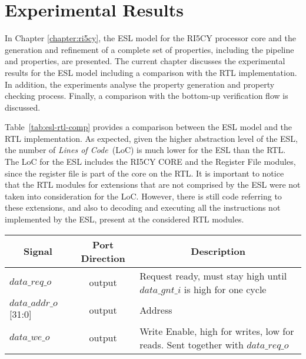 \chapter{Experimental Results}

In Chapter \ref{chapter:ri5cy}, the ESL model for the RI5CY processor core and the generation and refinement of a complete set of properties, including the pipeline and \SSQED{} properties, are presented. The current chapter discusses the experimental results for the ESL model including a comparison with the RTL implementation. In addition, the experiments analyse the property generation and property checking process. Finally, a comparison with the bottom-up verification flow is discussed.

Table~\ref{tab:esl-rtl-comp} provides a comparison between the ESL model and the RTL implementation. As expected, given the higher abstraction level of the ESL, the number of \textit{Lines of Code}~(LoC) is much lower for the ESL than the RTL. The LoC for the ESL includes the RI5CY CORE and the Register File modules, since the register file is part of the core on the RTL. It is important to notice that the RTL modules for extensions that are not comprised by the ESL were not taken into consideration for the LoC. However, there is still code referring to these extensions, and also to decoding and executing all the instructions not implemented by the ESL, present at the considered RTL modules.

\begin{table*}[htb!] 
	\centering 
	\caption{LSU port signals of RI5CY processor\cite{manual-ri5cy}.} 
	\label{tab:esl-rtl-comp}
	\begin{tabular}{l|c|p{7cm}} 
		\multicolumn{1}{c}{\bfseries Signal} & \multicolumn{1}{c}{\bfseries Port Direction} & \multicolumn{1}{c}{\bfseries Description} \\     
		\hline	
		$data\_req\_o$  &  output & Request ready, must stay high until $data\_gnt\_i$ is        high for one cycle \\
		\hline
		$data\_addr\_o$[31:0]  &  output & Address \\
		\hline
		$data\_we\_o$  &  output & Write Enable, high for writes, low for reads. Sent            together with $data\_req\_o$ \\
	\end{tabular} 
\end{table*}

